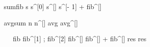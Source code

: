\documentclass[12pt,a4paper]{book}
\begin{document}
\begin{eqcode}{sum}{fib}{}{}
  s \in {} \lend
  s^{[0]}  \lend
  s^{[\iter]} \gets s^{[\iter - 1]} + fib^{[\iter]} \lend
   \lend
\end{eqcode}

\begin{eqcode}{avg}{sum}{}{}
  n \in {} \lend
  n^{[\iter]} \gets \iter \lend
  avg \in {} \lend
  avg^{[\iter]} \gets {} \lend
   \lend
\end{eqcode}

\begin{eqcode}{\mu}{\ }{\ }{}
  fib \in {} \lend
  fib^{[1]} ; fib^{[2]}  \lend
  fib^{[\iter]} \gets fib^{[]} + fib^{[]} \lend
  res \in {} \lend
  res \gets {} \lend
   \lend
   \lend
\end{eqcode}
\end{document}
